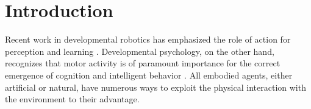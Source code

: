 %
%

%
%
%
%
\section{Introduction}
%
Recent work in developmental robotics has emphasized the role of
action for perception and learning
\cite{metta03early,natale04learning,natale05from}. Developmental
psychology, on the other hand, recognizes that motor activity is
of paramount importance for the correct emergence of cognition and
intelligent behavior
\cite{gibson88explore,streri93Seeing,bushnell93motor,hofsten04motor}.
All embodied agents, either artificial or natural, have numerous
ways to exploit the physical interaction with the environment to
their advantage.

